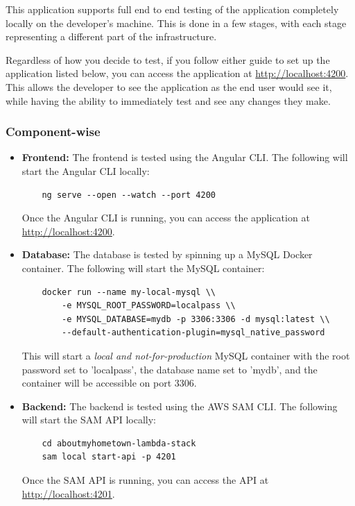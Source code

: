 \documentclass[12pt]{article}
\begin{document}
This application supports full end to end testing of the application completely locally on the developer's machine. This is done in a few stages, with each stage representing a different part of the infrastructure.

Regardless of how you decide to test, if you follow either guide to set up the application listed below, you can access the application at \url{http://localhost:4200}. This allows the developer to see the application as the end user would see it, while having the ability to immediately test and see any changes they make.

\subsubsection{Component-wise}
\begin{itemize}
    \item \textbf{Frontend:} The frontend is tested using the Angular CLI. The following will start the Angular CLI locally:

          \begin{verbatim}
    ng serve --open --watch --port 4200
          \end{verbatim}

          Once the Angular CLI is running, you can access the application at \url{http://localhost:4200}.

    \item \textbf{Database:} The database is tested by spinning up a MySQL Docker container. The following will start the MySQL container:

          \begin{verbatim}
    docker run --name my-local-mysql \\
        -e MYSQL_ROOT_PASSWORD=localpass \\
        -e MYSQL_DATABASE=mydb -p 3306:3306 -d mysql:latest \\
        --default-authentication-plugin=mysql_native_password
        \end{verbatim}

          This will start a \textit{local and not-for-production} MySQL container with the root password set to 'localpass', the database name set to 'mydb', and the container will be accessible on port 3306.

    \item \textbf{Backend:} The backend is tested using the AWS SAM CLI. The following will start the SAM API locally:

          \begin{verbatim}
    cd aboutmyhometown-lambda-stack
    sam local start-api -p 4201
          \end{verbatim}

          Once the SAM API is running, you can access the API at \url{http://localhost:4201}.
\end{itemize}
\end{document}
